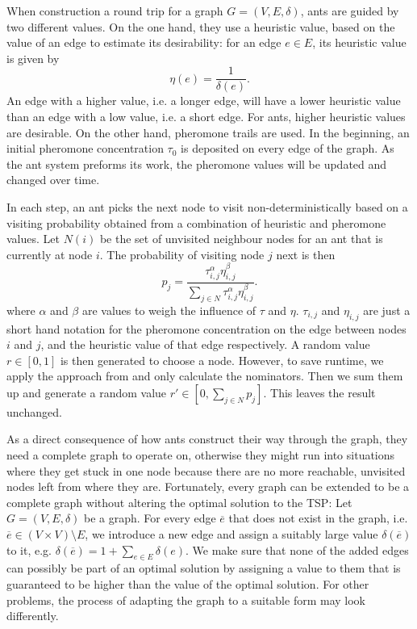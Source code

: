 When construction a round trip for a graph $G = \left( V, E, \delta \right)$, ants are guided by two different values. On the one hand, they use a heuristic value, based on the value of an edge to estimate its desirability: for an edge $e \in E$, its heuristic value is given by
\begin{equation}
  \label{eqn:eta}
  \eta \left( e \right) = \frac{1}{\delta \left( e \right)}.
\end{equation}
An edge with a higher value, i.e. a longer edge, will have a lower heuristic value than an edge with a low value, i.e. a short edge. For ants, higher heuristic values are desirable. On the other hand, pheromone trails are used. In the beginning, an initial pheromone concentration $\tau_0$ is deposited on every edge of the graph. As the ant system preforms its work, the pheromone values will be updated and changed over time.

In each step, an ant picks the next node to visit non-deterministically based on a visiting probability obtained from a combination of heuristic and pheromone values. Let $N \left( i \right)$ be the set of unvisited neighbour nodes for an ant that is currently at node $i$. The probability of visiting node $j$ next is then
\begin{equation}
  \label{eqn:probability}
  p_j = \frac{\tau_{i,j}^\alpha \eta_{i,j}^\beta}{\sum_{j \in N} \tau_{i,j}^\alpha \eta_{i,j}^\beta}.
\end{equation}
where $\alpha$ and $\beta$ are values to weigh the influence of $\tau$ and $\eta$. $\tau_{i,j}$ and $\eta_{i,j}$ are just a short hand notation for the pheromone concentration on the edge between nodes $i$ and $j$, and the heuristic value of that edge respectively. A random value $r \in \left[0, 1 \right]$ is then generated to choose a node. However, to save runtime, we apply the approach from \cite{Bloecker} and only calculate the nominators. Then we sum them up and generate a random value $r' \in \left[0, \sum_{j \in N} p_j \right]$. This leaves the result unchanged.

As a direct consequence of how ants construct their way through the graph, they need a complete graph to operate on, otherwise they might run into situations where they get stuck in one node because there are no more reachable, unvisited nodes left from where they are. Fortunately, every graph can be extended to be a complete graph without altering the optimal solution to the \textsc{TSP}: Let $G = \left( V, E, \delta \right)$ be a graph. For every edge $\overline{e}$ that does not exist in the graph, i.e. $\overline{e} \in \left( V \times V \right) \setminus E$, we introduce a new edge and assign a suitably large value $\delta \left( \overline{e} \right)$ to it, e.g. $\delta \left( \overline{e} \right) = 1 + \sum_{e \in E} \delta \left( e \right)$. We make sure that none of the added edges can possibly be part of an optimal solution by assigning a value to them that is guaranteed to be higher than the value of the optimal solution. For other problems, the process of adapting the graph to a suitable form may look differently.

